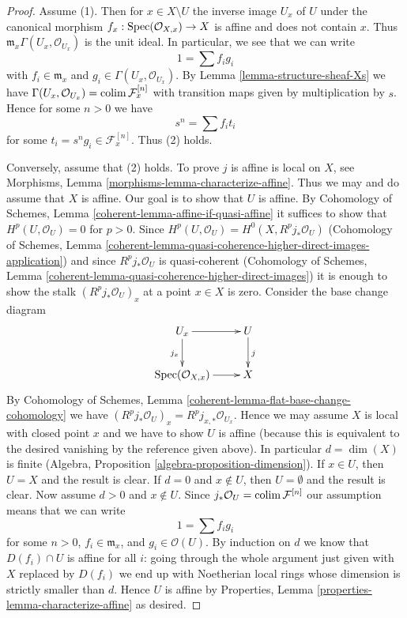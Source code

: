 \begin{proof}
Assume (1). Then for $x \in X \setminus U$ the inverse image $U_x$ of $U$
under the canonical morphism $f_x : \mathop{\mathrm{Spec}}(\mathcal{O}_{X, x}) \to X$ is affine
and does not contain $x$. Thus $\mathfrak m_x \Gamma(U_x, \mathcal{O}_{U_x})$
is the unit ideal. In particular, we see that we can write
$$
1 = \sum f_i g_i
$$
with $f_i \in \mathfrak m_x$ and $g_i \in \Gamma(U_x, \mathcal{O}_{U_x})$.
By Lemma \ref{lemma-structure-sheaf-Xs} we have
$\Gamma(U_x, \mathcal{O}_{U_x}) = \mathop{\mathrm{colim}}\nolimits \mathcal{F}^{[n]}_x$
with transition maps given by multiplication by $s$.
Hence for some $n > 0$ we have
$$
s^n = \sum f_i t_i
$$
for some $t_i = s^ng_i \in \mathcal{F}^{[n]}_x$. Thus (2) holds.

\medskip\noindent
Conversely, assume that (2) holds. To prove $j$ is affine is local on $X$,
see Morphisms, Lemma \ref{morphisms-lemma-characterize-affine}.
Thus we may and do assume that $X$ is affine. Our goal is to
show that $U$ is affine.
By Cohomology of Schemes, Lemma \ref{coherent-lemma-affine-if-quasi-affine}
it suffices to show that $H^p(U, \mathcal{O}_U) = 0$ for $p > 0$.
Since $H^p(U, \mathcal{O}_U) = H^0(X, R^pj_*\mathcal{O}_U)$
(Cohomology of Schemes, Lemma
\ref{coherent-lemma-quasi-coherence-higher-direct-images-application})
and since $R^pj_*\mathcal{O}_U$ is quasi-coherent
(Cohomology of Schemes, Lemma
\ref{coherent-lemma-quasi-coherence-higher-direct-images})
it is enough to show the stalk $(R^pj_*\mathcal{O}_U)_x$
at a point $x \in X$ is zero. Consider the base change diagram
$$
\xymatrix{
U_x \ar[d]_{j_x} \ar[r] & U \ar[d]^j \\
\Spec(\mathcal{O}_{X, x}) \ar[r] & X
}
$$
By Cohomology of Schemes, Lemma
\ref{coherent-lemma-flat-base-change-cohomology} we have
$(R^pj_*\mathcal{O}_U)_x = R^pj_{x, *}\mathcal{O}_{U_x}$.
Hence we may assume $X$ is local with closed point $x$
and we have to show $U$ is affine (because this is equivalent to
the desired vanishing by the reference given above).
In particular $d = \dim(X)$ is finite
(Algebra, Proposition \ref{algebra-proposition-dimension}).
If $x \in U$, then $U = X$ and the result is clear.
If $d = 0$ and $x \not \in U$, then $U = \emptyset$
and the result is clear. Now assume $d > 0$ and $x \not \in U$.
Since $j_*\mathcal{O}_U = \mathop{\mathrm{colim}}\nolimits \mathcal{F}^{[n]}$
our assumption means that we can write
$$
1 = \sum f_i g_i
$$
for some $n > 0$, $f_i \in \mathfrak m_x$, and $g_i \in \mathcal{O}(U)$.
By induction on $d$ we know that $D(f_i) \cap U$ is affine
for all $i$: going through the whole argument just given with
$X$ replaced by $D(f_i)$ we end up with Noetherian local rings
whose dimension is strictly smaller than $d$. Hence $U$
is affine by Properties, Lemma \ref{properties-lemma-characterize-affine}
as desired.
\end{proof}





